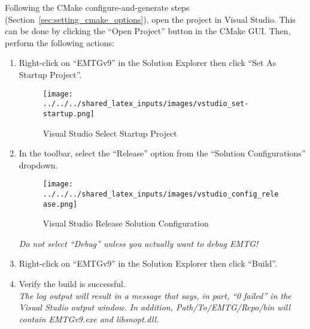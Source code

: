 
Following the CMake configure-and-generate steps (Section~\ref{sec:setting_cmake_options}), open the project in Visual Studio. This can be done by clicking the ``Open Project'' button in the CMake \ac{GUI}. Then, perform the following actions:

\begin{enumerate}
	\item Right-click on ``EMTGv9'' in the Solution Explorer then click ``Set As Startup Project''.
		\begin{figure}[H]
			\centering
			\texttt{[image: ../../../shared\_latex\_inputs/images/vstudio\_set-startup.png]}
			\caption{Visual Studio Select Startup Project}
		\end{figure}	
	\item In the toolbar, select the ``Release'' option from the ``Solution Configurations'' dropdown.
		\begin{figure}[H]
			\centering
			\texttt{[image: ../../../shared\_latex\_inputs/images/vstudio\_config\_release.png]}
			\caption{Visual Studio Release Solution Configuration}
		\end{figure}
		\emph{Do not select ``Debug'' unless you actually want to debug \ac{EMTG}!}
	\item Right-click on ``EMTGv9'' in the Solution Explorer then click ``Build''.
	\item Verify the build is successful. \\ \emph{The log output will result in a message that says, in part, ``0 failed'' in the Visual Studio output window. In addition, Path/To/EMTG/Repo/bin will contain EMTGv9.exe and libsnopt.dll.}
\end{enumerate}